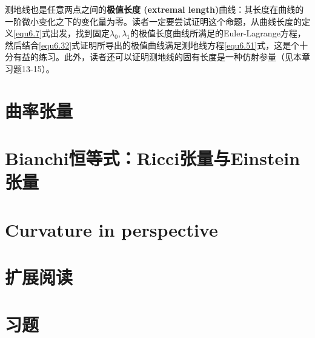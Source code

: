 测地线也是任意两点之间的\textbf{极值长度 (extremal length)}曲线：其长度在曲线的一阶微小变化之下的变化量为零。读者一定要尝试证明这个命题，从曲线长度的定义\eqref{equ6.7}式出发，找到固定$\lambda_0, \lambda_1$的极值长度曲线所满足的Euler-Lagrange方程，然后结合\eqref{equ6.32}式证明所导出的极值曲线满足测地线方程\eqref{equ6.51}式，这是个十分有益的练习。此外，读者还可以证明测地线的固有长度是一种仿射参量（见本章习题13-15）。

\section{曲率张量}
\label{sec6.5}

\section{Bianchi恒等式：Ricci张量与Einstein张量}
\label{sec6.6}

\section{Curvature in perspective}
\label{sec6.7}

\section{扩展阅读}
\label{sec6.8}

\section{习题}
\label{sec6.9}